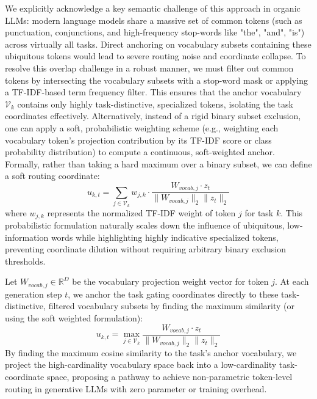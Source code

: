 We explicitly acknowledge a key semantic challenge of this approach in organic LLMs: modern language models share a massive set of common tokens (such as punctuation, conjunctions, and high-frequency stop-words like "the", "and", "is") across virtually all tasks. Direct anchoring on vocabulary subsets containing these ubiquitous tokens would lead to severe routing noise and coordinate collapse. To resolve this overlap challenge in a robust manner, we must filter out common tokens by intersecting the vocabulary subsets with a stop-word mask or applying a TF-IDF-based term frequency filter. This ensures that the anchor vocabulary $\mathcal{V}_k$ contains only highly task-distinctive, specialized tokens, isolating the task coordinates effectively. Alternatively, instead of a rigid binary subset exclusion, one can apply a soft, probabilistic weighting scheme (e.g., weighting each vocabulary token's projection contribution by its TF-IDF score or class probability distribution) to compute a continuous, soft-weighted anchor. Formally, rather than taking a hard maximum over a binary subset, we can define a soft routing coordinate:
\begin{equation}
  u_{k, t} = \sum_{j \in \mathcal{V}_k} w_{j, k} \cdot \frac{W_{vocab, j} \cdot z_t}{\|W_{vocab, j}\|_2 \|z_t\|_2}
\end{equation}
where $w_{j, k}$ represents the normalized TF-IDF weight of token $j$ for task $k$. This probabilistic formulation naturally scales down the influence of ubiquitous, low-information words while highlighting highly indicative specialized tokens, preventing coordinate dilution without requiring arbitrary binary exclusion thresholds.

Let $W_{vocab, j} \in \mathbb{R}^D$ be the vocabulary projection weight vector for token $j$. At each generation step $t$, we anchor the task gating coordinates directly to these task-distinctive, filtered vocabulary subsets by finding the maximum similarity (or using the soft weighted formulation):
\begin{equation}
  u_{k, t} = \max_{j \in \mathcal{V}_k} \frac{W_{vocab, j} \cdot z_t}{\|W_{vocab, j}\|_2 \|z_t\|_2}
\end{equation}
By finding the maximum cosine similarity to the task's anchor vocabulary, we project the high-cardinality vocabulary space back into a low-cardinality task-coordinate space, proposing a pathway to achieve non-parametric token-level routing in generative LLMs with zero parameter or training overhead.

